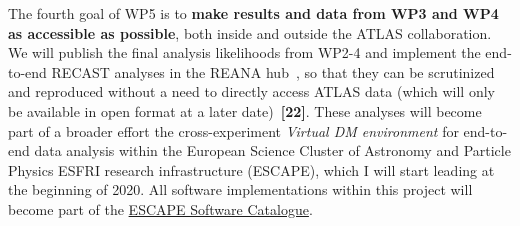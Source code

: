 The fourth goal of WP5 is to \textbf{make results and data from WP3 and WP4 as accessible as possible}, both inside and outside the ATLAS collaboration. 
We will publish the final analysis likelihoods from WP2-4 and implement the end-to-end RECAST analyses in the REANA hub~\cite{ToBeCited}, %
so that they can be scrutinized and reproduced without a need to directly access ATLAS data (which will only be available in open format at a later date)~\textbf{[22]}.
These analyses will become part of a broader effort the cross-experiment \textit{Virtual DM environment} for end-to-end data analysis within the European Science Cluster of Astronomy and Particle Physics ESFRI research infrastructure (ESCAPE), which I will start leading at the beginning of 2020. 
All software implementations within this project will become part of the \href{https://projectescape.eu/services/escape-software-data-catalogue}{ESCAPE Software Catalogue}. 




